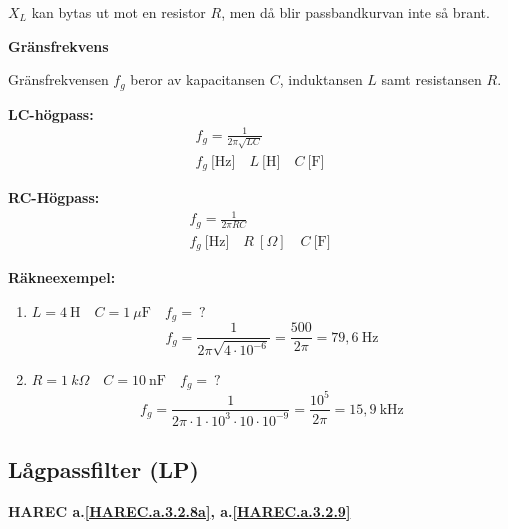 \(X_L\) kan bytas ut mot en resistor \(R\), men då blir passbandkurvan inte så
brant.

\textbf{Gränsfrekvens}

Gränsfrekvensen \(f_g\) beror av kapacitansen \(C\), induktansen \(L\) samt
resistansen \(R\).

\textbf{LC-högpass:}
\begin{gather*}
  f_g = \frac{1}{2\pi \sqrt{LC}} \\
  f_g\ \text{[Hz]} \quad L\ \text{[H]} \quad C\ \text{[F]}
\end{gather*}

\textbf{RC-Högpass:}
\begin{gather*}
  f_g = \frac{1}{2\pi RC}\\
  f_g\ \text{[Hz]} \quad R\ [\Omega] \quad C\ \text{[F]}
\end{gather*}

\textbf{Räkneexempel:}
\begin{enumerate}
\item \(L = 4\ \text{H} \quad C = 1\ \mu\text{F} \quad f_g =\ ?\)
  \[
  f_g = \frac{1}{2\pi \sqrt{4 \cdot 10^{-6}}} = \frac{500}{2\pi }
  = 79,6\ \text{Hz}
  \]
\item \(R = 1\ k\Omega \quad C = 10\ \text{nF} \quad f_g =\ ?\)
  \[
    f_g = \frac{1}{2\pi  \cdot 1 \cdot 10^3 \cdot 10 \cdot 10^{-9}}
    = \frac{10^5}{2\pi } = 15,9\ \text{kHz}
  \]
\end{enumerate}

\subsection{Lågpassfilter (LP)}
\textbf{HAREC
  a.\ref{HAREC.a.3.2.8a}\label{myHAREC.a.3.2.8a},
  a.\ref{HAREC.a.3.2.9}\label{myHAREC.a.3.2.9b}
}

